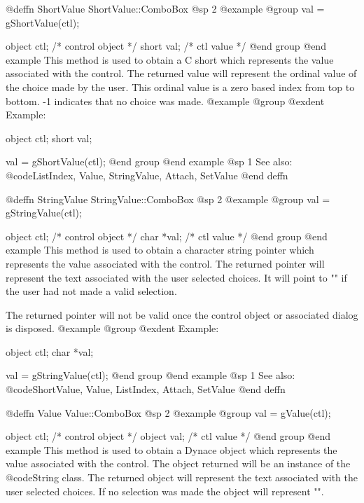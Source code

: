 @deffn {ShortValue} ShortValue::ComboBox
@sp 2
@example
@group
val = gShortValue(ctl);

object  ctl;   /*  control object  */
short   val;   /*  ctl value       */
@end group
@end example
This method is used to obtain a C short which represents the value
associated with the control.  The returned value will represent the
ordinal value of the choice made by the user.  This ordinal value is a
zero based index from top to bottom.  -1 indicates that no choice was
made.
@example
@group
@exdent Example:

object  ctl;
short   val;

val = gShortValue(ctl);
@end group
@end example
@sp 1
See also:  @code{ListIndex, Value, StringValue, Attach, SetValue}
@end deffn










@deffn {StringValue} StringValue::ComboBox
@sp 2
@example
@group
val = gStringValue(ctl);

object  ctl;   /*  control object  */
char    *val;  /*  ctl value       */
@end group
@end example
This method is used to obtain a character string pointer which
represents the value associated with the control.  The returned pointer
will represent the text associated with the user selected choices.
It will point to "" if the user had not made a valid selection.

The returned pointer will not be valid once the control object or
associated dialog is disposed.
@example
@group
@exdent Example:

object  ctl;
char    *val;

val = gStringValue(ctl);
@end group
@end example
@sp 1
See also:  @code{ShortValue, Value, ListIndex, Attach, SetValue}
@end deffn










@deffn {Value} Value::ComboBox
@sp 2
@example
@group
val = gValue(ctl);

object  ctl;   /*  control object  */
object  val;   /*  ctl value       */
@end group
@end example
This method is used to obtain a Dynace object which represents the value
associated with the control.  The object returned will be an instance of
the @code{String} class.  The returned object will represent the text
associated with the user selected choices.  If no selection was made
the object will represent "".

